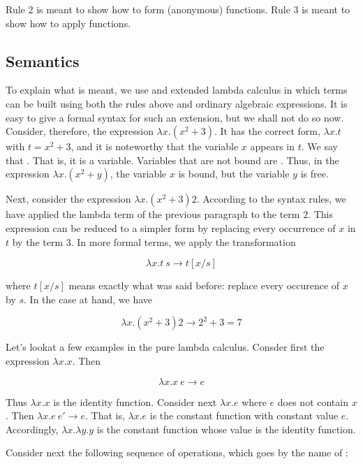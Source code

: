 Rule 2 is meant to show how to form (anonymous) functions.  Rule 3 is meant to show how to apply functions.  

\subsection{Semantics}

To explain what is meant, we use and extended lambda calculus in which terms can be built using both the rules above and ordinary algebraic expressions. It is easy to give a formal syntax for such an extension, but we shall not do so now.  Consider, therefore, the expression $\lambda x.(x^2 + 3)$.  It has the correct form, $\lambda x.t$ with $t = x^2  + 3$, and it is noteworthy that the variable $x$ appears in $t$.  We say that . That is, it is a  variable.  Variables that are not bound are .  Thus, in the expression $\lambda x. (x^2 + y)$, the variable $x$ is bound, but the variable $y$ is free.

Next, consider the expression $\lambda x.(x^2 + 3) 2$.  According to the syntax rules, we have applied the lambda term of the previous paragraph to the term $2$.  This expression can be reduced to a simpler form by replacing every occurrence of $x$ in $t$ by the term $3$.  In more formal terms, we apply the transformation

\begin{equation}
\lambda x.t\ s \to t[x/s]
\end{equation}

where $t[x/s]$ means exactly what was said before: replace every occurence of $x$ by $s$.  In the case at hand, we have

\begin{equation}
\lambda x.(x^2 + 3) 2 \to 2^2 + 3 = 7
\end{equation}

Let's lookat a few examples in the pure lambda calculus.  Consder first the expression $\lambda x.x$.  Then

$$
\lambda x.x \ e \to e
$$

Thus $\lambda x.x$ is the identity function.  Consider next $\lambda x.e$ where $e$ does not contain $x$.  Then $\lambda x.e\ e' \to e$.  That is, $\lambda x.e$ is the constant function with constant value $e$.  Accordingly, $\lambda x.\lambda y.y$ is the constant function whose value is the identity function. 

Consider next the following sequence of operations, which goes by the name of :

